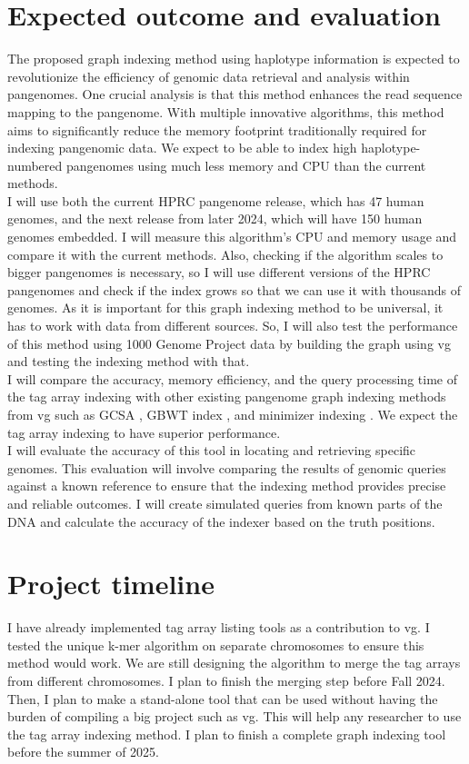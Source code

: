 \documentclass[11pt]{ucthesis}
\begin{document}
\section{Expected outcome and evaluation}
The proposed graph indexing method using haplotype information is expected to revolutionize the efficiency of genomic data retrieval and analysis within pangenomes. One crucial analysis is that this method enhances the read sequence mapping to the pangenome. With multiple innovative algorithms, this method aims to significantly reduce the memory footprint traditionally required for indexing pangenomic data. We expect to be able to index high haplotype-numbered pangenomes using much less memory and CPU than the current methods. \\ 
I will use both the current HPRC pangenome release, which has 47 human genomes, and the next release from later 2024, which will have 150 human genomes embedded. I will measure this algorithm's CPU and memory usage and compare it with the current methods. Also, checking if the algorithm scales to bigger pangenomes is necessary, so I will use different versions of the HPRC pangenomes and check if the index grows so that we can use it with thousands of genomes.
As it is important for this graph indexing method to be universal, it has to work with data from different sources. So, I will also test the performance of this method using 1000 Genome Project \cite{10002015global} data by building the graph using vg and testing the indexing method with that. \\
I will compare the accuracy, memory efficiency, and the query processing time of the tag array indexing with other existing pangenome graph indexing methods from vg such as GCSA \cite{siren2017indexing}, GBWT index \cite{siren2020haplotype}, and minimizer indexing \cite{siren2021pangenomics}. We expect the tag array indexing to have superior performance. \\
I will evaluate the accuracy of this tool in locating and retrieving specific genomes. This evaluation will involve comparing the results of genomic queries against a known reference to ensure that the indexing method provides precise and reliable outcomes. I will create simulated queries from known parts of the DNA and calculate the accuracy of the indexer based on the truth positions.

\section{Project timeline}
I have already implemented tag array listing tools as a contribution to vg. I tested the unique k-mer algorithm on separate chromosomes to ensure this method would work. We are still designing the algorithm to merge the tag arrays from different chromosomes. I plan to finish the merging step before Fall 2024. Then, I plan to make a stand-alone tool that can be used without having the burden of compiling a big project such as vg. This will help any researcher to use the tag array indexing method. I plan to finish a complete graph indexing tool before the summer of 2025. 
\end{document}
